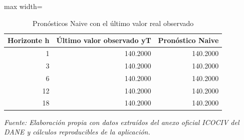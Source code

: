 \begin{table}[H]
\centering
\caption{Pronósticos Naive con el último valor real observado}
\label{tab:ejemplo_naive_vias_urbanas}
\scriptsize
\begin{adjustbox}{max width=\linewidth}
\begin{tabular}{rrr}
\toprule
Horizonte h & Último valor observado yT & Pronóstico Naive \\
\midrule
1 & 140.2000 & 140.2000 \\
3 & 140.2000 & 140.2000 \\
6 & 140.2000 & 140.2000 \\
12 & 140.2000 & 140.2000 \\
18 & 140.2000 & 140.2000 \\
\bottomrule
\end{tabular}
\end{adjustbox}
\par\footnotesize\textit{Fuente: Elaboración propia con datos extraídos del anexo oficial ICOCIV del DANE y cálculos reproducibles de la aplicación.}
\end{table}
